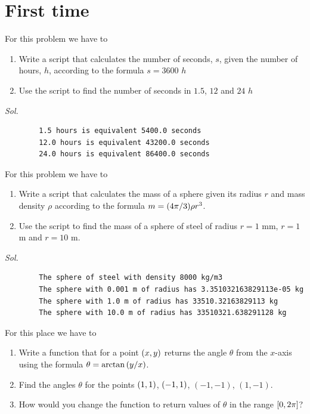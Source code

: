 \chapter{First time}
    
    \begin{problem}[Seconds]\label{problem_2.1}
        For this problem we have to
        \begin{enumerate}
            \item Write a script that calculates the number of seconds, $s$, given the number of hours, $h$, according to the formula $s=3600$ $h$
            \item Use the script to find the number of seconds in $1.5$, $12$ and $24$ $h$
        \end{enumerate}
    \end{problem}
    \textit{ Sol. } 
    
    \begin{verbatim}
        1.5 hours is equivalent 5400.0 seconds
        12.0 hours is equivalent 43200.0 seconds
        24.0 hours is equivalent 86400.0 seconds
    \end{verbatim}


    \begin{problem}\label{problem_2.2}
        For this problem we have to
        \begin{enumerate}
            \item Write a script that calculates the mass of a sphere given its radius $r$ and mass density $\rho$ according to the formula $m=\qty(4\pi/3)\rho r^{3}$.
            \item Use the script to find the mass of a sphere of steel of radius $r=1$ mm, $r=1$ m and $r=10$ m.
        \end{enumerate}
    \end{problem}
    \textit{ Sol. }
    
    \begin{verbatim}
        The sphere of steel with density 8000 kg/m3
        The sphere with 0.001 m of radius has 3.351032163829113e-05 kg
        The sphere with 1.0 m of radius has 33510.32163829113 kg
        The sphere with 10.0 m of radius has 33510321.638291128 kg
    \end{verbatim}

   
    \begin{problem}[Angle]\label{problem_2.3}
        For this place we have to
        \begin{enumerate}
            \item Write a function that for a point $\qty(x,y)$ returns the angle $\theta$ from the $x$-axis using the formula $\theta = \arctan{\qty(y/x)}$.
            \item Find the angles $\theta$ for the points $\qty(1,1)$, $\qty(-1,1)$, $(-1,-1)$, $(1,-1)$.
            \item How would you change the function to return values of $\theta$ in the range $\qty[0,2\pi]$?
        \end{enumerate}
    \end{problem}


